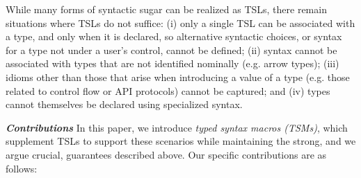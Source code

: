 \documentclass{sig-alternate}[10pt]
\begin{document}
While many forms of syntactic sugar can be realized as TSLs, there remain situations where TSLs do not suffice: (i) only a single TSL can be associated with a type, and only when it is declared, so alternative syntactic choices, or syntax for a type not under a user's control, cannot be defined; (ii) syntax cannot be associated with types that are not identified nominally (e.g. arrow types); (iii) idioms other than those that arise when introducing a value of a type (e.g. those related to control flow or API protocols) cannot be captured; and (iv) types cannot themselves be declared using specialized syntax. 

\vspace{3px}
\noindent\textbf{\textit{Contributions}} In this paper, we introduce \emph{typed syntax macros (TSMs)}, which supplement TSLs to support these scenarios while maintaining the strong, and we argue crucial, guarantees described above. Our specific contributions are as follows:%


\end{document}
